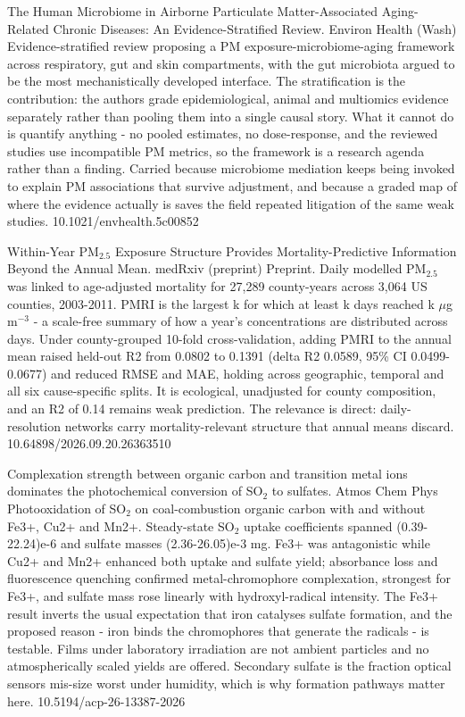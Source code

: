 \documentclass[10pt]{article}
\begin{document}
{The Human Microbiome in Airborne Particulate Matter-Associated Aging-Related Chronic Diseases: An Evidence-Stratified Review.}
{Environ Health (Wash)}
{Evidence-stratified review proposing a PM exposure-microbiome-aging framework across respiratory, gut and skin compartments, with the gut microbiota argued to be the most mechanistically developed interface. The stratification is the contribution: the authors grade epidemiological, animal and multiomics evidence separately rather than pooling them into a single causal story. What it cannot do is quantify anything - no pooled estimates, no dose-response, and the reviewed studies use incompatible PM metrics, so the framework is a research agenda rather than a finding. Carried because microbiome mediation keeps being invoked to explain PM associations that survive adjustment, and because a graded map of where the evidence actually is saves the field repeated litigation of the same weak studies.}
{10.1021/envhealth.5c00852}


{Within-Year PM$_{2.5}$ Exposure Structure Provides Mortality-Predictive Information Beyond the Annual Mean.}
{medRxiv (preprint)}
{Preprint. Daily modelled PM$_{2.5}$ was linked to age-adjusted mortality for 27,289 county-years across 3,064 US counties, 2003-2011. PMRI is the largest k for which at least k days reached k $\mu$g\,m$^{-3}$ - a scale-free summary of how a year's concentrations are distributed across days. Under county-grouped 10-fold cross-validation, adding PMRI to the annual mean raised held-out R2 from 0.0802 to 0.1391 (delta R2 0.0589, 95\% CI 0.0499-0.0677) and reduced RMSE and MAE, holding across geographic, temporal and all six cause-specific splits. It is ecological, unadjusted for county composition, and an R2 of 0.14 remains weak prediction. The relevance is direct: daily-resolution networks carry mortality-relevant structure that annual means discard.}
{10.64898/2026.09.20.26363510}

{Complexation strength between organic carbon and transition metal ions dominates the photochemical conversion of SO$_2$ to sulfates.}
{Atmos Chem Phys}
{Photooxidation of SO$_2$ on coal-combustion organic carbon with and without Fe3+, Cu2+ and Mn2+. Steady-state SO$_2$ uptake coefficients spanned (0.39-22.24)e-6 and sulfate masses (2.36-26.05)e-3 mg. Fe3+ was antagonistic while Cu2+ and Mn2+ enhanced both uptake and sulfate yield; absorbance loss and fluorescence quenching confirmed metal-chromophore complexation, strongest for Fe3+, and sulfate mass rose linearly with hydroxyl-radical intensity. The Fe3+ result inverts the usual expectation that iron catalyses sulfate formation, and the proposed reason - iron binds the chromophores that generate the radicals - is testable. Films under laboratory irradiation are not ambient particles and no atmospherically scaled yields are offered. Secondary sulfate is the fraction optical sensors mis-size worst under humidity, which is why formation pathways matter here.}
{10.5194/acp-26-13387-2026}
\end{document}
